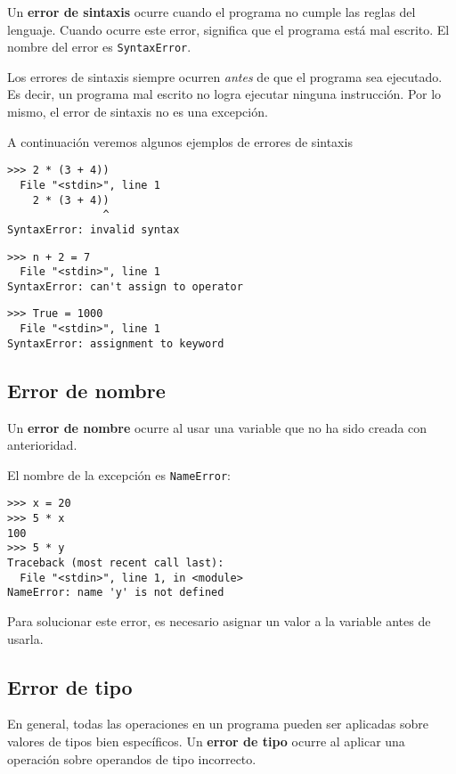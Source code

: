 Un \textbf{error de sintaxis} ocurre cuando el programa no cumple las
reglas del lenguaje. Cuando ocurre este error, significa que el programa
está mal escrito. El nombre del error es \lstinline!SyntaxError!.

Los errores de sintaxis siempre ocurren \emph{antes} de que el programa
sea ejecutado. Es decir, un programa mal escrito no logra ejecutar
ninguna instrucción. Por lo mismo, el error de sintaxis no es una
excepción.

A continuación veremos algunos ejemplos de errores de sintaxis

\begin{lstlisting}
>>> 2 * (3 + 4))               
  File "<stdin>", line 1
    2 * (3 + 4))
               ^
SyntaxError: invalid syntax
\end{lstlisting}

\begin{lstlisting}
>>> n + 2 = 7
  File "<stdin>", line 1
SyntaxError: can't assign to operator
\end{lstlisting}

\begin{lstlisting}
>>> True = 1000
  File "<stdin>", line 1
SyntaxError: assignment to keyword
\end{lstlisting}

\subsection{Error de nombre}

Un \textbf{error de nombre} ocurre al usar una variable que no ha sido
creada con anterioridad.

El nombre de la excepción es \lstinline!NameError!:

\begin{lstlisting}
>>> x = 20
>>> 5 * x
100
>>> 5 * y
Traceback (most recent call last):
  File "<stdin>", line 1, in <module>
NameError: name 'y' is not defined
\end{lstlisting}

Para solucionar este error, es necesario asignar un valor a la variable
antes de usarla.

\subsection{Error de tipo}

En general, todas las operaciones en un programa pueden ser aplicadas
sobre valores de tipos bien específicos. Un \textbf{error de tipo}
ocurre al aplicar una operación sobre operandos de tipo incorrecto.

